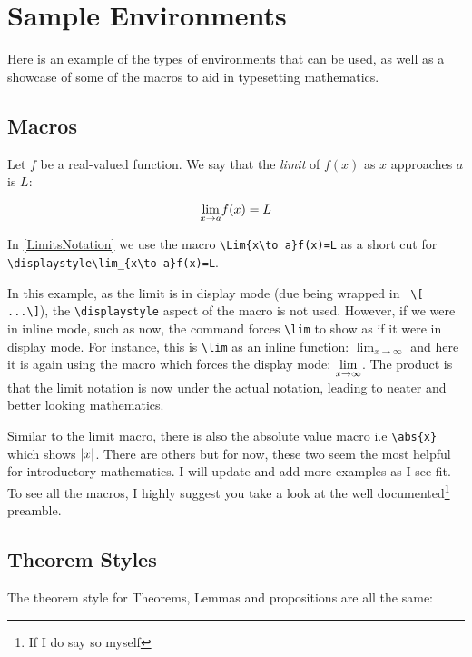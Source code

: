 \section{Sample Environments}

Here is an example of the types of environments that can be used, as well as a showcase of some of the macros to aid in typesetting mathematics. 

\subsection{Macros}

\begin{notation}[Limits] \label{LimitsNotation}
	Let \(f\) be a real-valued function. We say that the \emph{limit} of \(f(x)\) as \(x\) approaches \(a\) is \(L\):

	\[\displaystyle{\lim_{x\to a}}f(x)=L\]
\end{notation}

In \cref{LimitsNotation} we use the macro \verb!\Lim{x\to a}f(x)=L! as a short cut for \verb!\displaystyle\lim_{x\to a}f(x)=L!. 

\begin{remark} 
	In this example, as the limit is in display mode (due being wrapped in \verb! \[ ...\]!), the \verb!\displaystyle! aspect of the macro is not used. However, if we were in inline mode, such as now, the command forces \verb!\lim! to show as if it were in display mode. For instance, this is \verb!\lim! as an inline function: \(\lim_{x\to\infty}\) and here it is again using the macro which forces the display mode: \(\displaystyle{\lim_{x\to\infty}}\). The product is that the limit notation is now under the actual notation, leading to neater and better looking mathematics.
\end{remark}

Similar to the limit macro, there is also the absolute value macro i.e \verb!\abs{x}! which shows \(\left\lvert x\right\rvert\). There are others but for now, these two seem the most helpful for introductory mathematics. I will update and add more examples as I see fit. To see all the macros, I highly suggest you take a look at the well documented\footnote{If I do say so myself} preamble.

\subsection{Theorem Styles}

The theorem style for Theorems, Lemmas and propositions are all the same:

